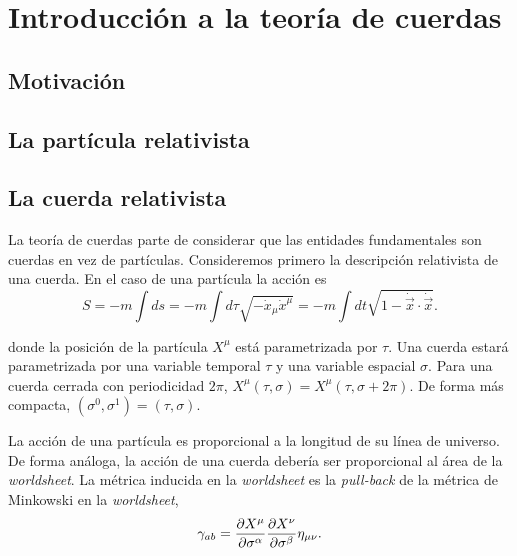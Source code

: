 \chapter{Introducción a la teoría de cuerdas}


\section{Motivación}


\section{La partícula relativista}


\section{La cuerda relativista}


La teoría de cuerdas parte de considerar que las entidades fundamentales son cuerdas
en vez de partículas. 
Consideremos primero la descripción relativista de una cuerda. En el caso de una
partícula la acción es
\begin{equation}
  S=-m\int ds = -m\int d\tau \sqrt{-\dot{x}_\mu\dot{x}^\mu}=-m\int dt \sqrt{1-\dot {\vec{x}} \cdot \dot {\vec{x}}}.
\end{equation}

donde la posición de la partícula $X^\mu$ está parametrizada por $\tau$.
Una cuerda estará parametrizada por una variable temporal $\tau$ y una variable espacial $\sigma$.
Para una cuerda cerrada con periodicidad $2\pi$, $X^\mu(\tau,\sigma)=X^\mu(\tau,\sigma+2\pi)$.
De forma más compacta, $(\sigma^0,\sigma^1)=(\tau,\sigma)$.

La acción de una partícula es proporcional a la longitud de su línea de universo.
De forma análoga, la acción de una cuerda debería ser proporcional al área de la
\emph{worldsheet}. 
La métrica inducida en la \emph{worldsheet} es la \emph{pull-back} de la métrica de Minkowski
en la \emph{worldsheet},
\begin{equation}
  \gamma_{ab}=\pdv{X^\mu}{\sigma^\alpha}\pdv{X^\nu}{\sigma^\beta}\eta_{\mu\nu}.
\end{equation}

